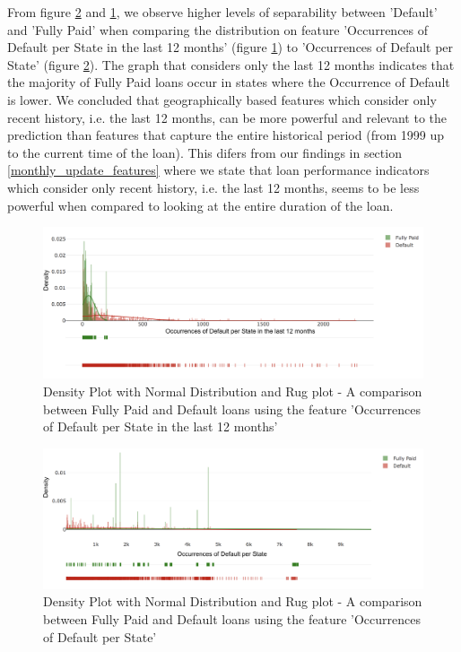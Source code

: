             From figure \ref{fig:default_per_st} and \ref{fig:default_per_st_12_months}, we observe higher levels of separability between 'Default' and 'Fully Paid' when comparing the distribution on feature 'Occurrences of Default per State in the last 12 months' (figure \ref{fig:default_per_st_12_months}) to 'Occurrences of Default per State' (figure \ref{fig:default_per_st}). The graph that considers only the last 12 months indicates that the majority of Fully Paid loans occur in states where the Occurrence of Default is lower. We concluded that geographically based features which consider only recent history, i.e. the last 12 months, can be more powerful and relevant to the prediction than features that capture the entire historical period (from 1999 up to the current time of the loan). This difers from our findings in section \ref{monthly_update_features} where we state that loan performance indicators which consider only recent history, i.e. the last 12 months, seems to be less powerful when compared to looking at the entire duration of the loan. 
            
            \begin{figure}[H]
                \centering
                \hspace*{-0.5cm}\includegraphics[width=1.1\textwidth]{Images/occr_default_per_state_12_mon_12_mon.png}
                \caption{Density Plot with Normal Distribution and Rug plot - A comparison between Fully Paid and Default loans using the feature 'Occurrences of Default per State in the last 12 months'}
                \label{fig:default_per_st_12_months}
            \end{figure}
            
            \begin{figure}[H]
                \centering
                \hspace*{-0.5cm}\includegraphics[width=1.1\textwidth]{Images/occr_default_per_state_dist.png}
                \caption{Density Plot with Normal Distribution and Rug plot - A comparison between Fully Paid and Default loans using the feature 'Occurrences of Default per State'}
                \label{fig:default_per_st}
            \end{figure}

